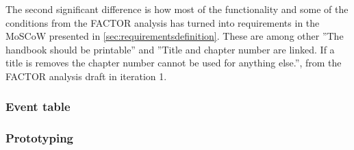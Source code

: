 The second significant difference is how most of the functionality and some of the conditions from the FACTOR analysis has turned into requirements in the MoSCoW presented in \cref{sec:requirementsdefinition}. 
These are among other ''The handbook should be printable'' and ''Title and chapter number are linked. If a title is removes the chapter number cannot be used for anything else.'', from the FACTOR analysis draft in iteration 1.

\subsubsection*{Event table}

\subsubsection*{Prototyping}




